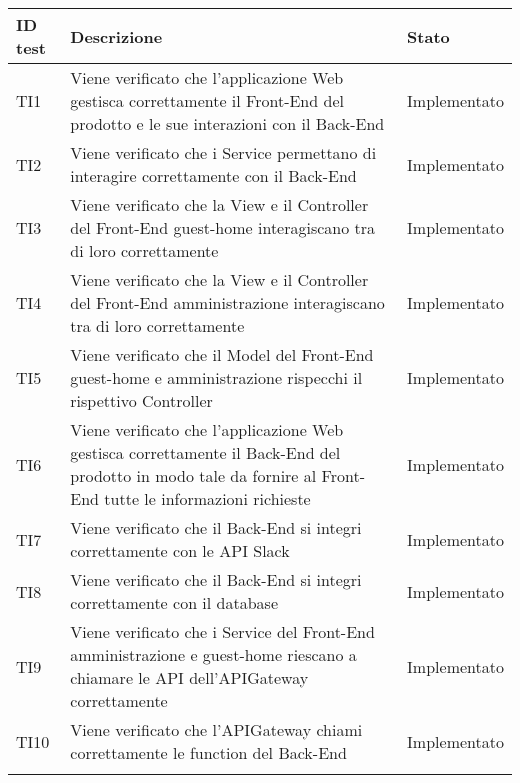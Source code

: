 \documentclass[../PianoDiQualifica_v3.0.0.tex]{subfiles}
\begin{document}
	\begin{longtable}[c] { >{\centering\arraybackslash}p{4cm} p{7cm} >{\centering\arraybackslash}p{4cm}}
		\toprule
		\centerline{\textbf{ID test}} & \centerline{\textbf{Descrizione}} & \centerline{\textbf{Stato}} \\
			\midrule
			TI1 & Viene verificato che l'applicazione Web gestisca correttamente
il Front-End del prodotto e le sue interazioni con il Back-End & Implementato \\
			\addlinespace[0.3em]
			\midrule
			\addlinespace[0.3em]
			TI2 & Viene verificato che i Service permettano di interagire correttamente con il Back-End & Implementato \\
			\addlinespace[0.3em]
			\midrule
			\addlinespace[0.3em]
			TI3 & Viene verificato che la View e il Controller del Front-End guest-home interagiscano tra di loro correttamente & Implementato \\
			\addlinespace[0.3em]
			\midrule
			\addlinespace[0.3em]
			TI4 & Viene verificato che la View e il Controller del Front-End amministrazione interagiscano tra di loro correttamente & Implementato \\
			\addlinespace[0.3em]
			\midrule
			\addlinespace[0.3em]
			TI5 & Viene verificato che il Model del Front-End guest-home e amministrazione rispecchi il rispettivo Controller & Implementato \\
			\addlinespace[0.3em]
			\midrule
			\addlinespace[0.3em]
			TI6 & Viene verificato che l'applicazione Web gestisca correttamente il Back-End del prodotto in modo tale da fornire al Front-End tutte le informazioni richieste & Implementato \\
			\addlinespace[0.3em]
			\midrule
			\addlinespace[0.3em]
			TI7 & Viene verificato che il Back-End si integri correttamente con le API Slack & Implementato \\
			\addlinespace[0.3em]
			\midrule
			\addlinespace[0.3em]
			TI8 & Viene verificato che il Back-End si integri correttamente con il database & Implementato \\
			\addlinespace[0.3em]
			\midrule
			\addlinespace[0.3em]
			TI9 & Viene verificato che i Service del Front-End amministrazione e guest-home riescano a chiamare le API dell'APIGateway correttamente & Implementato \\
			\addlinespace[0.3em]
			\midrule
			\addlinespace[0.3em]
			TI10 & Viene verificato che l'APIGateway chiami correttamente le function del Back-End & Implementato \\
			\addlinespace[0.3em]

\end{longtable}
\end{document}
